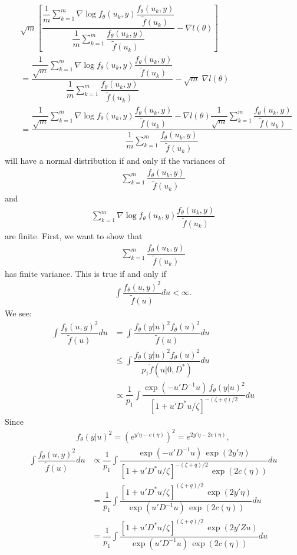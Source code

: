 \documentclass{article}
\begin{document}
\begin{align}
&\sqrt{m} \left[  \dfrac{\dfrac{1}{m}\sum_{k=1}^m    \nabla \log f_\theta(u_k,y)   \dfrac{f_\theta(u_k,y)}{\tilde{f}(u_k)} }{\dfrac{1}{m} \sum_{k=1}^m  \dfrac{f_\theta(u_k,y)}{\tilde{f}(u_k)}  }- \nabla l(\theta)  \right] \\
&=
\dfrac{\dfrac{1}{\sqrt{m}}\sum_{k=1}^m     \nabla \log f_\theta(u_k,y)   \dfrac{f_\theta(u_k,y)}{\tilde{f}(u_k)} }{\dfrac{1}{m} \sum_{k=1}^m  \dfrac{f_\theta(u_k,y)}{\tilde{f}(u_k)} }- \sqrt{m}\; \nabla  l(\theta)  \\
&=\dfrac{\dfrac{1}{\sqrt{m}}\sum_{k=1}^m     \nabla \log f_\theta(u_k,y)   \dfrac{f_\theta(u_k,y)}{\tilde{f}(u_k)} 
 -\nabla l(\theta) \dfrac{1}{\sqrt{m}}\sum_{k=1}^m  \dfrac{f_\theta(u_k,y)}{\tilde{f}(u_k)} }{\dfrac{1}{m} \sum_{k=1}^m  \dfrac{f_\theta(u_k,y)}{\tilde{f}(u_k)} }   
\end{align}
will have a normal distribution if and only if the variances of
\begin{align}
\sum_{k=1}^m  \dfrac{f_\theta(u_k,y)}{\tilde{f}(u_k)}
\end{align}
and
\begin{align}
\sum_{k=1}^m     \nabla \log f_\theta(u_k,y)\dfrac{f_\theta(u_k,y)}{\tilde{f}(u_k)} 
\end{align}
are finite.
First, we want to show that
\begin{align}
\sum_{k=1}^m \dfrac{f_\theta(u_k,y)}{\tilde{f}(u_k)}
\end{align}
has finite variance. This is true if and only if 
\begin{align}
\int \dfrac{f_\theta(u,y)^2}{\tilde{f}(u)} du < \infty.
\end{align}
We see:
\begin{align}
\int \dfrac{f_\theta(u,y)^2}{\tilde{f}(u)} du &=\int \dfrac{f_\theta(y|u)^2 f_\theta(u)^2}{\tilde{f}(u)} du\\
&\leq \int \dfrac{f_\theta(y|u)^2 f_\theta(u)^2}{p_1 \grave{f}(u|0,D^*)} du\\
&\propto \dfrac{1}{p_1} \int \dfrac{\exp(-u'D^{-1}u) \, f_\theta(y|u)^2  }{\left[ 1+u'D^*u/\zeta  \right]^{-(\zeta+q)/2}} du
\end{align}
Since
\begin{align}
f_\theta(y|u)^2=\left( e^{y'\eta-c(\eta)} \right)^2 = e^{2y'\eta-2c(\eta)} ,
\end{align}
\begin{align}
\int \dfrac{f_\theta(u,y)^2}{\tilde{f}(u)} du &\propto \dfrac{1}{p_1} \int \dfrac{\exp(-u'D^{-1}u) \, \exp(2y'\eta)  }{\left[ 1+u'D^*u/\zeta  \right]^{-(\zeta+q)/2} \,  \exp(2c(\eta))  } du\\
&=\dfrac{1}{p_1} \int \dfrac{ \left[ 1+u'D^*u/\zeta  \right]^{(\zeta+q)/2} \, \exp(2y'\eta)  }{\exp(u'D^{-1}u)   \,  \exp(2c(\eta))  } du \\
&=\dfrac{1}{p_1} \int \dfrac{ \left[ 1+u'D^*u/\zeta  \right]^{(\zeta+q)/2} \, \exp(2y'Zu)  }{\exp(u'D^{-1}u)   \,  \exp(2c(\eta))  } du 
\end{align}
\end{document}
